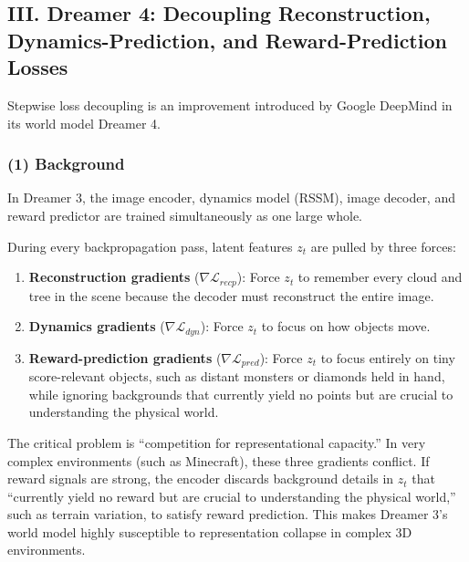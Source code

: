 \hypertarget{iii.-dreamer-4-decoupling-reconstruction-dynamics-prediction-and-reward-prediction-losses}{%
\subsection{III. Dreamer 4: Decoupling Reconstruction, Dynamics-Prediction, and Reward-Prediction Losses}\label{iii.-dreamer-4-decoupling-reconstruction-dynamics-prediction-and-reward-prediction-losses}}

Stepwise loss decoupling is an improvement introduced by Google DeepMind in its world model Dreamer 4.

\hypertarget{background-4}{%
\subsubsection{(1) Background}\label{background-4}}

In Dreamer 3, the image encoder, dynamics model (RSSM), image decoder, and reward predictor are trained simultaneously as one large whole.

During every backpropagation pass, latent features \(z_t\) are pulled by three forces:

\begin{enumerate}
\def\labelenumi{\arabic{enumi}.}
\tightlist
\item
  \textbf{Reconstruction gradients} (\(\nabla \mathcal{L}_{recp}\)): Force \(z_t\) to remember every cloud and tree in the scene because the decoder must reconstruct the entire image.
\item
  \textbf{Dynamics gradients} (\(\nabla \mathcal{L}_{dyn}\)): Force \(z_t\) to focus on how objects move.
\item
  \textbf{Reward-prediction gradients} (\(\nabla \mathcal{L}_{pred}\)): Force \(z_t\) to focus entirely on tiny score-relevant objects, such as distant monsters or diamonds held in hand, while ignoring backgrounds that currently yield no points but are crucial to understanding the physical world.
\end{enumerate}

The critical problem is ``competition for representational capacity.'' In very complex environments (such as Minecraft), these three gradients conflict. If reward signals are strong, the encoder discards background details in \(z_t\) that ``currently yield no reward but are crucial to understanding the physical world,'' such as terrain variation, to satisfy reward prediction. This makes Dreamer 3's world model highly susceptible to representation collapse in complex 3D environments.

